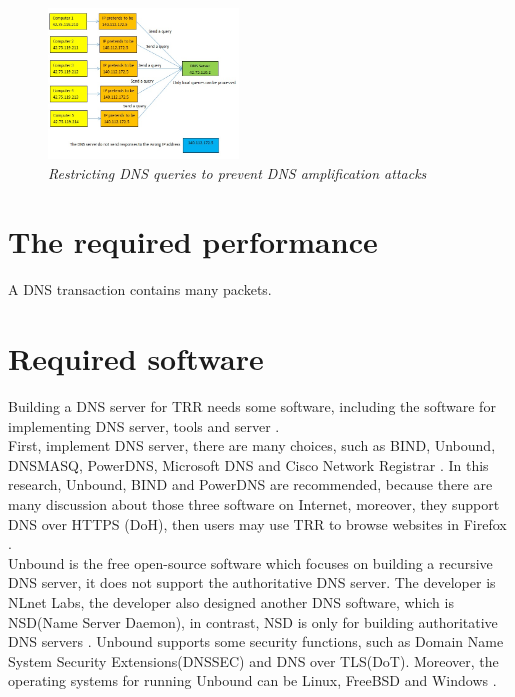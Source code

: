 \documentclass[conference]{IEEEtran}
\begin{document}
\begin{figure}[hbt!]  
    \centering
    \includegraphics[width=0.45\textwidth]{figure/only_local_queries.jpg}
    \caption{\em Restricting DNS queries to prevent DNS amplification attacks \cite{Why_recursive_dns_not_recommended_video} \label{fig:restricting_DNS_queries}}
\end{figure}

\section{The required performance}

A DNS transaction contains many packets.
\\

\section{Required software}


Building a DNS server for TRR needs some software, including the software for implementing DNS server, tools and server \cite{DNS_resources}.
\\

First, implement DNS server, there are many choices, such as BIND, Unbound, DNSMASQ, PowerDNS, Microsoft DNS and Cisco Network Registrar \cite{DNS_software_wiki} \cite{Bind_dnsmasq_PowerDNS_Unbound}. In this research, Unbound, BIND and PowerDNS are recommended, because there are many discussion about those three software on Internet, moreover, they support DNS over HTTPS (DoH), then users may use TRR to browse websites in Firefox \cite{Building_DOH} \cite{DNS_over_HTTPS_servers}.
\\

Unbound is the free open-source software which focuses on building a recursive DNS server, it does not support the authoritative DNS server. The developer is NLnet Labs, the developer also designed another DNS software, which is NSD(Name Server Daemon), in contrast, NSD is only for building authoritative DNS servers \cite{NSD_wiki}. Unbound supports some security functions, such as Domain Name System Security Extensions(DNSSEC) and DNS over TLS(DoT). Moreover, the operating systems for running Unbound can be Linux, FreeBSD and Windows \cite{Unbound_wiki}.
\\
\end{document}

